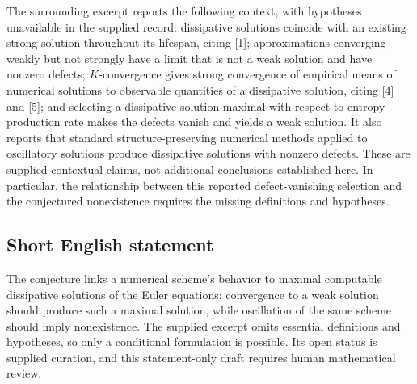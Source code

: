 \documentclass[11pt]{article}
\begin{document}
The surrounding excerpt reports the following context, with hypotheses unavailable in the supplied record: dissipative solutions coincide with an existing strong solution throughout its lifespan, citing [1]; approximations converging weakly but not strongly have a limit that is not a weak solution and have nonzero defects; \(K\)-convergence gives strong convergence of empirical means of numerical solutions to observable quantities of a dissipative solution, citing [4] and [5]; and selecting a dissipative solution maximal with respect to entropy-production rate makes the defects vanish and yields a weak solution. It also reports that standard structure-preserving numerical methods applied to oscillatory solutions produce dissipative solutions with nonzero defects. These are supplied contextual claims, not additional conclusions established here. In particular, the relationship between this reported defect-vanishing selection and the conjectured nonexistence requires the missing definitions and hypotheses.
\subsection{Short English statement}
The conjecture links a numerical scheme's behavior to maximal computable dissipative solutions of the Euler equations: convergence to a weak solution should produce such a maximal solution, while oscillation of the same scheme should imply nonexistence. The supplied excerpt omits essential definitions and hypotheses, so only a conditional formulation is possible. Its open status is supplied curation, and this statement-only draft requires human mathematical review.
\end{document}
